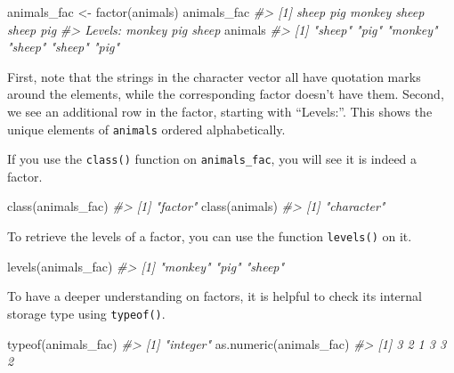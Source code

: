 \documentclass[
]{book}
\newenvironment{Shaded}{\begin{snugshade}}{\end{snugshade}}
\newcommand{\CommentTok}[1]{\textcolor[rgb]{0.56,0.35,0.01}{\textit{#1}}}
\newcommand{\FunctionTok}[1]{\textcolor[rgb]{0.00,0.00,0.00}{#1}}
\newcommand{\NormalTok}[1]{#1}
\newcommand{\OtherTok}[1]{\textcolor[rgb]{0.56,0.35,0.01}{#1}}
\begin{document}
\begin{Shaded}
\begin{Highlighting}[]
\NormalTok{animals\_fac }\OtherTok{\textless{}{-}} \FunctionTok{factor}\NormalTok{(animals)  }
\NormalTok{animals\_fac}
\CommentTok{\#\textgreater{} [1] sheep  pig    monkey sheep  sheep  pig   }
\CommentTok{\#\textgreater{} Levels: monkey pig sheep}
\NormalTok{animals}
\CommentTok{\#\textgreater{} [1] "sheep"  "pig"    "monkey" "sheep"  "sheep"  "pig"}
\end{Highlighting}
\end{Shaded}

First, note that the strings in the character vector all have quotation marks around the elements, while the corresponding factor doesn't have them. Second, we see an additional row in the factor, starting with ``Levels:''. This shows the unique elements of \texttt{animals} ordered alphabetically.

If you use the \texttt{class()} function on \texttt{animals\_fac}, you will see it is indeed a factor.

\begin{Shaded}
\begin{Highlighting}[]
\FunctionTok{class}\NormalTok{(animals\_fac)}
\CommentTok{\#\textgreater{} [1] "factor"}
\FunctionTok{class}\NormalTok{(animals)}
\CommentTok{\#\textgreater{} [1] "character"}
\end{Highlighting}
\end{Shaded}

To retrieve the levels of a factor, you can use the function \texttt{levels()} on it.

\begin{Shaded}
\begin{Highlighting}[]
\FunctionTok{levels}\NormalTok{(animals\_fac)}
\CommentTok{\#\textgreater{} [1] "monkey" "pig"    "sheep"}
\end{Highlighting}
\end{Shaded}

To have a deeper understanding on factors, it is helpful to check its internal storage type using \texttt{typeof()}.

\begin{Shaded}
\begin{Highlighting}[]
\FunctionTok{typeof}\NormalTok{(animals\_fac)}
\CommentTok{\#\textgreater{} [1] "integer"}
\FunctionTok{as.numeric}\NormalTok{(animals\_fac)}
\CommentTok{\#\textgreater{} [1] 3 2 1 3 3 2}
\end{Highlighting}
\end{Shaded}
\end{document}
